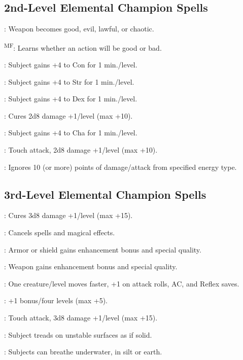 \subsection{2nd-Level Elemental Champion Spells}

: Weapon becomes good, evil, lawful, or chaotic.

\textsuperscript{MF}: Learns whether an action will be good or bad.

: Subject gains +4 to Con for 1 min./level.

: Subject gains +4 to Str for 1 min./level.

: Subject gains +4 to Dex for 1 min./level.

: Cures 2d8 damage +1/level (max +10).

: Subject gains +4 to Cha for 1 min./level.

: Touch attack, 2d8 damage +1/level (max +10).

: Ignores 10 (or more) points of damage/attack from specified energy type.




\subsection{3rd-Level Elemental Champion Spells}

: Cures 3d8 damage +1/level (max +15).

: Cancels spells and magical effects.

: Armor or shield gains enhancement bonus and special quality. %

: Weapon gains enhancement bonus and special quality. %

: One creature/level moves faster, +1 on attack rolls, AC, and Reflex saves.

: +1 bonus/four levels (max +5).

: Touch attack, 3d8 damage +1/level (max +15).

: Subject treads on unstable surfaces as if solid. %

: Subjects can breathe underwater, in silt or earth. %





